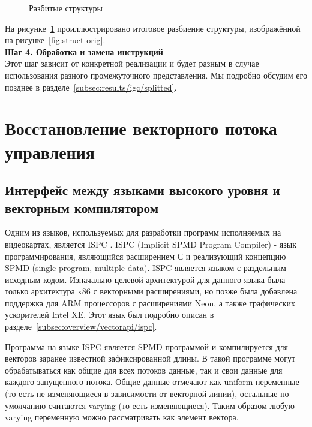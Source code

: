 \begin{figure}[ht]
    \caption{Разбитые структуры}\label{fig:struct-splitted}
\end{figure}

На рисунке~\cref{fig:struct-splitted} проиллюстрировано итоговое разбиение структуры, изображённой на рисунке~\cref{fig:struct-orig}.\\

\textbf{Шаг 4. Обработка и замена инструкций}\\

Этот шаг зависит от конкретной реализации и будет разным в случае использования разного промежуточного представления. Мы подробно обсудим его позднее в разделе~\cref{subsec:results/igc/splitted}.

\section{Восстановление векторного потока управления}\label{sec:lowering/simdcf}

\subsection{Интерфейс между языками высокого уровня и векторным компилятором}\label{sec:lowering/simdcf/intface}

Одним из языков, используемых для разработки программ исполняемых на видеокартах, является ISPC \cite{pharr2012ispc}. ISPC (Implicit SPMD Program Compiler) - язык программирования, являющийся расширением С и реализующий концепцию SPMD (single program, multiple data). ISPC является языком с раздельным исходным кодом. Изначально целевой архитектурой для данного языка была только архитектура x86 с векторными расширениями, но позже была добавлена поддержка для ARM процессоров с расширениями Neon, а также графических ускорителей Intel XE. Этот язык был подробно описан в разделе~\cref{subsec:overview/vectorapi/ispc}.

Программа на языке ISPC является SPMD программой и компилируется для векторов заранее известной зафиксированной длины. В такой программе могут обрабатываться как общие для всех потоков данные, так и свои данные для каждого запущенного потока. Общие данные отмечают как uniform переменные (то есть не изменяющиеся в зависимости от векторной линии), остальные по умолчанию считаются varying (то есть изменяющиеся). Таким образом любую varying переменную можно рассматривать как элемент вектора.

